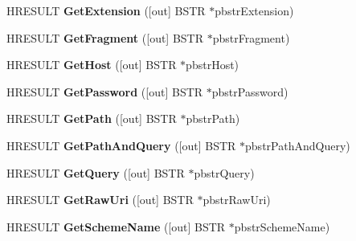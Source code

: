 \begin{DoxyCompactItemize}
\item 
\mbox{\label{interface_i_uri_ac9d602fcf796b8f30fef237f9bfbe86d}} 
H\+R\+E\+S\+U\+LT {\bfseries Get\+Extension} (\mbox{[}out\mbox{]} B\+S\+TR $\ast$pbstr\+Extension)
\item 
\mbox{\label{interface_i_uri_a1815881eff67a105301fd3eb847de305}} 
H\+R\+E\+S\+U\+LT {\bfseries Get\+Fragment} (\mbox{[}out\mbox{]} B\+S\+TR $\ast$pbstr\+Fragment)
\item 
\mbox{\label{interface_i_uri_a07979a458ca53e26fcdf22b9d69147f3}} 
H\+R\+E\+S\+U\+LT {\bfseries Get\+Host} (\mbox{[}out\mbox{]} B\+S\+TR $\ast$pbstr\+Host)
\item 
\mbox{\label{interface_i_uri_a4a7cda9af77c134171aefaec83a440a3}} 
H\+R\+E\+S\+U\+LT {\bfseries Get\+Password} (\mbox{[}out\mbox{]} B\+S\+TR $\ast$pbstr\+Password)
\item 
\mbox{\label{interface_i_uri_a1bc189ab9082ae3659bc7cbdda7853cb}} 
H\+R\+E\+S\+U\+LT {\bfseries Get\+Path} (\mbox{[}out\mbox{]} B\+S\+TR $\ast$pbstr\+Path)
\item 
\mbox{\label{interface_i_uri_a4589d22fb9928d4ad40596e1f9e8a6db}} 
H\+R\+E\+S\+U\+LT {\bfseries Get\+Path\+And\+Query} (\mbox{[}out\mbox{]} B\+S\+TR $\ast$pbstr\+Path\+And\+Query)
\item 
\mbox{\label{interface_i_uri_a33aa001db30c11fc95448f2c51ce560b}} 
H\+R\+E\+S\+U\+LT {\bfseries Get\+Query} (\mbox{[}out\mbox{]} B\+S\+TR $\ast$pbstr\+Query)
\item 
\mbox{\label{interface_i_uri_a2369a32572d8cdbf53205ac8a24c748a}} 
H\+R\+E\+S\+U\+LT {\bfseries Get\+Raw\+Uri} (\mbox{[}out\mbox{]} B\+S\+TR $\ast$pbstr\+Raw\+Uri)
\item 
\mbox{\label{interface_i_uri_aeab9a5e2ab809d5888e4c7d4a5323774}} 
H\+R\+E\+S\+U\+LT {\bfseries Get\+Scheme\+Name} (\mbox{[}out\mbox{]} B\+S\+TR $\ast$pbstr\+Scheme\+Name)
\item 
\mbox{\label{interface_i_uri_a0d2a0667978c6a49e824a548749d8635}} 

\end{DoxyCompactItemize}
